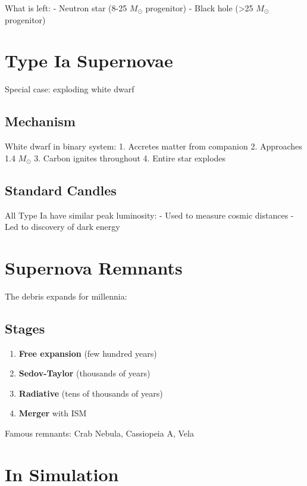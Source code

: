 \documentclass[
  11pt,
  letterpaper,
  twoside,
  openright]{book}
\providecommand{\tightlist}{%
  \setlength{\itemsep}{0pt}\setlength{\parskip}{0pt}}
\begin{document}
What is left: - Neutron star (8-25 \(M_\odot\) progenitor) - Black hole
(\textgreater25 \(M_\odot\) progenitor)

\section{Type Ia Supernovae}\label{type-ia-supernovae}

Special case: exploding white dwarf

\subsection{Mechanism}\label{mechanism-1}

White dwarf in binary system: 1. Accretes matter from companion 2.
Approaches 1.4 \(M_\odot\) 3. Carbon ignites throughout 4. Entire star
explodes

\subsection{Standard Candles}\label{standard-candles}

All Type Ia have similar peak luminosity: - Used to measure cosmic
distances - Led to discovery of dark energy

\section{Supernova Remnants}\label{supernova-remnants}

The debris expands for millennia:

\subsection{Stages}\label{stages}

\begin{enumerate}
\def\labelenumi{\arabic{enumi}.}
\tightlist
\item
  \textbf{Free expansion} (few hundred years)
\item
  \textbf{Sedov-Taylor} (thousands of years)
\item
  \textbf{Radiative} (tens of thousands of years)
\item
  \textbf{Merger} with ISM
\end{enumerate}

Famous remnants: Crab Nebula, Cassiopeia A, Vela

\section{In Simulation}\label{in-simulation-14}
\end{document}

